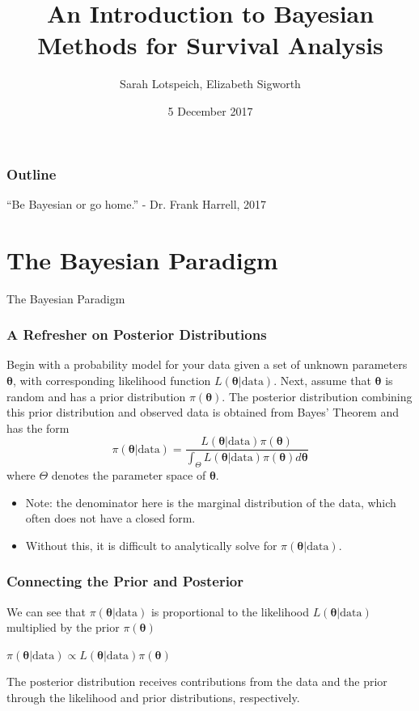 \documentclass{beamer}
\title{An Introduction to Bayesian Methods for Survival Analysis}
\author{Sarah Lotspeich, Elizabeth Sigworth}
\institute{Vanderbilt University}
\date{5 December 2017}
\begin{document}
\begin{frame}
\titlepage
\end{frame}

\begin{frame}
\frametitle{Outline}
\tableofcontents
\end{frame}

\begin{frame}[c]
\begin{center}
\Huge
``Be Bayesian or go home.''  
\huge
- Dr. Frank Harrell, 2017
\end{center}
\end{frame}

\section{The Bayesian Paradigm}
\begin{frame}[c]
\begin{center}
\huge
The Bayesian Paradigm
\end{center}
\end{frame}

\begin{frame}
\frametitle{A Refresher on Posterior Distributions}
Begin with a probability model for your data given a set of unknown parameters $\pmb{\theta}$, with corresponding likelihood function $L(\pmb{\theta}|\text{data})$. Next, assume that $\pmb{\theta}$ is random and has a \color{orange} prior distribution \color{black} $\pi(\pmb{\theta})$. The posterior distribution combining this prior distribution and observed data is obtained from Bayes' Theorem and has the form
$$\pi(\pmb{\theta}|\text{data}) = \frac{L(\pmb{\theta}|\text{data})\pi(\pmb{\theta})}{\int_{\Theta}L(\pmb{\theta}|\text{data})\pi(\pmb{\theta}) d\pmb{\theta}}$$
where $\Theta$ denotes the parameter space of $\pmb{\theta}$. \footnotemark
\begin{itemize}
\item Note: the denominator here is the \color{orange} marginal distribution \color{black} of the data, which often does not have a closed form. 
\item Without this, it is difficult to analytically solve for $\pi(\pmb{\theta}|\text{data})$. 
\end{itemize}
\end{frame}

\begin{frame}
\frametitle{Connecting the Prior and Posterior}
We can see that $\pi(\pmb{\theta}|\text{data})$ is proportional to the likelihood $L(\pmb{\theta}|\text{data})$ multiplied by the prior $\pi(\pmb{\theta})$

\begin{center}
$\pi(\pmb{\theta}|\text{data}) \propto L(\pmb{\theta}|\text{data})\pi(\pmb{\theta})$
\end{center}

The posterior distribution receives contributions from the data and the prior through the likelihood and prior distributions, respectively. 
\end{frame}
\end{document}
